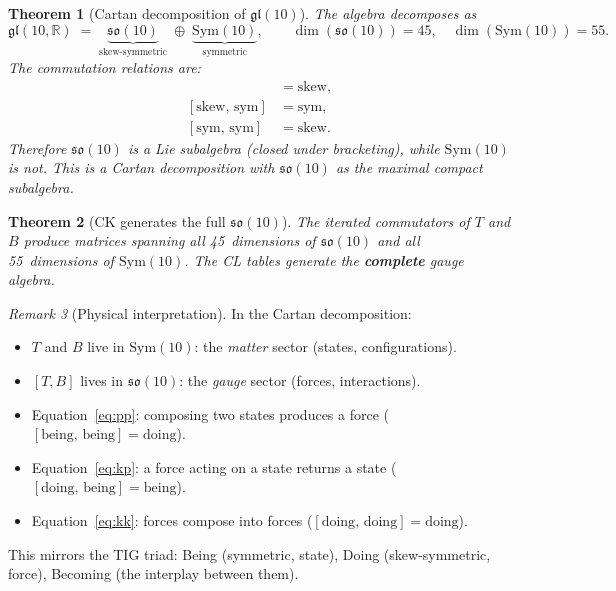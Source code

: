 \documentclass[11pt]{article}
\newtheorem{theorem}{Theorem}[section]
\theoremstyle{definition}
\theoremstyle{remark}
\newtheorem{remark}[theorem]{Remark}
\begin{document}
\begin{theorem}[Cartan decomposition of $\mathfrak{gl}(10)$]
\label{thm:cartan}
The algebra decomposes as
\[
  \mathfrak{gl}(10,\mathbb{R}) \;=\;
  \underbrace{\mathfrak{so}(10)}_{\text{skew-symmetric}}
  \;\oplus\;
  \underbrace{\mathrm{Sym}(10)}_{\text{symmetric}},
  \qquad
  \dim(\mathfrak{so}(10)) = 45,\quad
  \dim(\mathrm{Sym}(10)) = 55.
\]
The commutation relations are:
\begin{align}
  [\text{skew},\,\text{skew}] &= \text{skew}, \label{eq:kk}\\
  [\text{skew},\,\text{sym}]  &= \text{sym},  \label{eq:kp}\\
  [\text{sym},\,\text{sym}]   &= \text{skew}. \label{eq:pp}
\end{align}
Therefore $\mathfrak{so}(10)$ is a Lie subalgebra (closed under bracketing),
while $\mathrm{Sym}(10)$ is not.  This is a Cartan decomposition with
$\mathfrak{so}(10)$ as the maximal compact subalgebra.
\end{theorem}

\begin{theorem}[CK generates the full $\mathfrak{so}(10)$]
\label{thm:full-so10}
The iterated commutators of $T$ and $B$ produce matrices spanning all
45~dimensions of $\mathfrak{so}(10)$ and all 55~dimensions of
$\mathrm{Sym}(10)$.  The CL tables generate the \textbf{complete} gauge algebra.
\end{theorem}

\begin{remark}[Physical interpretation]
In the Cartan decomposition:
\begin{itemize}[nosep]
  \item $T$ and $B$ live in $\mathrm{Sym}(10)$: the \emph{matter} sector
        (states, configurations).
  \item $[T,B]$ lives in $\mathfrak{so}(10)$: the \emph{gauge} sector
        (forces, interactions).
  \item Equation~\eqref{eq:pp}: composing two states produces a force
        ($[\text{being},\,\text{being}] = \text{doing}$).
  \item Equation~\eqref{eq:kp}: a force acting on a state returns a state
        ($[\text{doing},\,\text{being}] = \text{being}$).
  \item Equation~\eqref{eq:kk}: forces compose into forces
        ($[\text{doing},\,\text{doing}] = \text{doing}$).
\end{itemize}
This mirrors the TIG triad: Being (symmetric, state), Doing (skew-symmetric,
force), Becoming (the interplay between them).
\end{remark}
\end{document}

